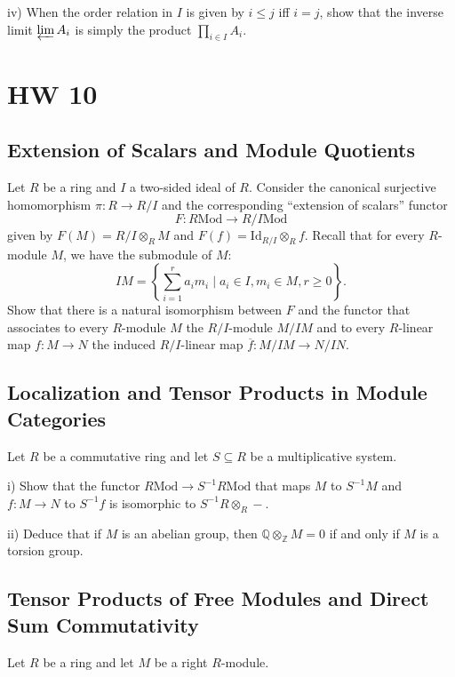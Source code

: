 \documentclass[lang=cn,11pt]{template}
\begin{document}
iv) When the order relation in \( I \) is given by \( i \leq j \) iff \( i = j \), show that the inverse limit \( \varprojlim A_i \) is simply the product \( \prod_{i \in I} A_i \).







\chapter{HW 10}

\section{Extension of Scalars and Module Quotients}
Let \( R \) be a ring and \( I \) a two-sided ideal of \( R \). Consider the canonical surjective homomorphism \( \pi : R \rightarrow R/I \) and the corresponding “extension of scalars” functor
\[
F : R\text{Mod} \rightarrow R/I\text{Mod}
\]
given by \( F(M) = R/I \otimes_R M \) and \( F(f) = \text{Id}_{R/I} \otimes_R f \). Recall that for every \( R \)-module \( M \), we have the submodule of \( M \):
\[
IM = \left\{ \sum_{i=1}^r a_i m_i \mid a_i \in I, m_i \in M, r \geq 0 \right\}.
\]
Show that there is a natural isomorphism between \( F \) and the functor that associates to every \( R \)-module \( M \) the \( R/I \)-module \( M/IM \) and to every \( R \)-linear map \( f : M \rightarrow N \) the induced \( R/I \)-linear map \( \overline{f} : M/IM \rightarrow N/IN \).

\section{Localization and Tensor Products in Module Categories}
Let \( R \) be a commutative ring and let \( S \subseteq R \) be a multiplicative system.

i) Show that the functor \( R\text{Mod} \rightarrow S^{-1}R\text{Mod} \) that maps \( M \) to \( S^{-1}M \) and \( f : M \rightarrow N \) to \( S^{-1}f \) is isomorphic to \( S^{-1}R \otimes_R - \).

ii) Deduce that if \( M \) is an abelian group, then \( \mathbb{Q} \otimes_{\mathbb{Z}} M = 0 \) if and only if \( M \) is a torsion group.

\section{Tensor Products of Free Modules and Direct Sum Commutativity}
Let \( R \) be a ring and let \( M \) be a right \( R \)-module.
\end{document}
